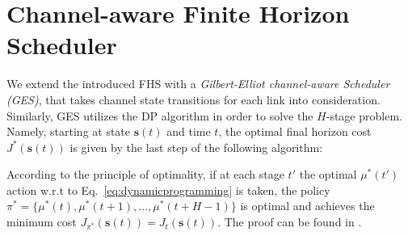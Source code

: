 \section{Channel-aware Finite Horizon Scheduler} \label{sec:gescheduler}

We extend the introduced FHS with a \textit{Gilbert-Elliot channel-aware
Scheduler (GES)}, that takes channel state transitions for each link into
consideration. Similarly, GES utilizes the DP algorithm in order to solve the
$H$-stage problem. Namely, starting at state $\boldsymbol{s}(t)$ and time $t$,
the optimal final horizon cost $J^*(\boldsymbol{s}(t))$ is given by the last
step of the following algorithm:


\begin{center}
\end{center}
  

According to the principle of optimality, if at each stage $t'$ the optimal
$\mu^*(t')$ action w.r.t to Eq.~\eqref{eq:dynamicprogramming} is taken, the
policy $\pi^* = \{\mu^*(t), \mu^*(t+1), \dots, \mu^*(t + H-1)\}$ is optimal and
achieves the minimum cost $J_{\pi^*}(\boldsymbol{s}(t)) = J_t(\boldsymbol{s}(t))
$. The proof can be found in \cite{bertsekas1995dynamic}.

